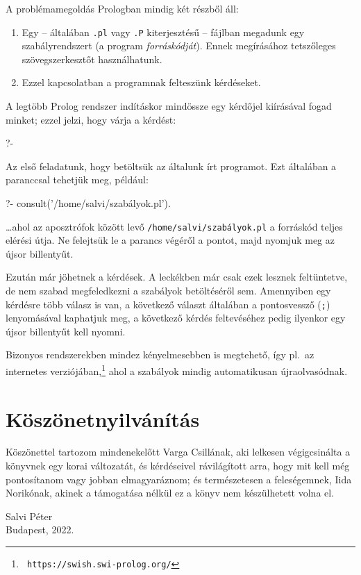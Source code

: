 A problémamegoldás Prologban mindig két részből áll:
\begin{enumerate}
\item Egy -- általában {\tt .pl} vagy {\tt .P} kiterjesztésű --
  fájlban megadunk egy szabályrendszert (a program
  \emph{forráskódját}). Ennek megírásához tetszőleges
  szövegszerkesztőt használhatunk.
\item Ezzel kapcsolatban a programnak felteszünk kérdéseket.
\end{enumerate}
A legtöbb Prolog rendszer indításkor mindössze egy kérdőjel kiírásával
fogad minket; ezzel jelzi, hogy várja a kérdést:
\begin{query}
?-
\end{query}  
Az első feladatunk, hogy betöltsük az általunk írt programot. Ezt
általában a  paranccsal tehetjük meg, például:
\begin{query}
?- consult('/home/salvi/szabályok.pl').
\end{query}
\dots ahol az aposztrófok között levő {\tt /home/salvi/szabályok.pl} a
forráskód teljes elérési útja. Ne felejtsük le a parancs végéről a
pontot, majd nyomjuk meg az újsor billentyűt.

Ezután már jöhetnek a kérdések. A leckékben már csak ezek lesznek
feltüntetve, de nem szabad megfeledkezni a szabályok betöltéséről sem.
Amennyiben egy kérdésre több válasz is van, a következő választ
általában a pontosvessző ({\tt ;}) lenyomásával kaphatjuk meg, a
következő kérdés feltevéséhez pedig ilyenkor egy újsor billentyűt kell
nyomni.

Bizonyos rendszerekben mindez kényelmesebben is megtehető, így pl.~az
 internetes  verziójában,\footnote{\tt
https://swish.swi-prolog.org/} ahol a szabályok mindig automatikusan
újraolvasódnak.

\section*{Köszönetnyilvánítás}
Köszönettel tartozom mindenekelőtt Varga Csillának, aki lelkesen
végigcsinálta a könyvnek egy korai változatát, és kérdéseivel
rávilágított arra, hogy mit kell még pontosítanom vagy jobban
elmagyaráznom; és természetesen a feleségemnek, Iida Norikónak, akinek
a támogatása nélkül ez a könyv nem készülhetett volna el.

\begin{flushright}
  Salvi Péter\\
  Budapest, 2022.
\end{flushright}

\clearpage
\thispagestyle{empty}

